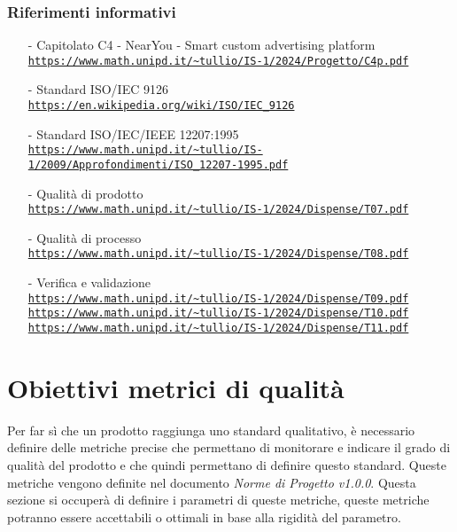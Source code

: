 \documentclass[11pt]{article}
\begin{document}
\begin{justify}
\subsubsection{Riferimenti informativi}
\begin{itemize}
    \item[-] Capitolato C4 - NearYou -
Smart custom advertising platform\\
    \textcolor{blue}{\texttt{\url{https://www.math.unipd.it/~tullio/IS-1/2024/Progetto/C4p.pdf}}}
    \item[-] Standard ISO/IEC 9126 \label{ISO 9126} \\
    \textcolor{blue}{\texttt{\url{https://en.wikipedia.org/wiki/ISO/IEC_9126}}}
    \item[-] Standard ISO/IEC/IEEE 12207:1995 \label{ISO 12207:1995}\\
    \textcolor{blue}{\texttt{\url{https://www.math.unipd.it/~tullio/IS-1/2009/Approfondimenti/ISO_12207-1995.pdf}}}
    \item[-] Qualità di prodotto\\
    \textcolor{blue}{\texttt{\url{https://www.math.unipd.it/~tullio/IS-1/2024/Dispense/T07.pdf}}}
    \item[-] Qualità di processo\\
    \textcolor{blue}{\texttt{\url{https://www.math.unipd.it/~tullio/IS-1/2024/Dispense/T08.pdf}}}
    \item[-] Verifica e validazione\\
    \textcolor{blue}{\texttt{\url{https://www.math.unipd.it/~tullio/IS-1/2024/Dispense/T09.pdf}}}\\
    \textcolor{blue}{\texttt{\url{https://www.math.unipd.it/~tullio/IS-1/2024/Dispense/T10.pdf}}}\\
    \textcolor{blue}{\texttt{\url{https://www.math.unipd.it/~tullio/IS-1/2024/Dispense/T11.pdf}}}



\end{itemize}
\newpage

\section{Obiettivi metrici di qualità}
Per far sì che un prodotto raggiunga uno standard qualitativo, è necessario definire delle metriche precise che permettano di monitorare e indicare il grado di qualità del prodotto e che quindi permettano di definire questo standard.
Queste metriche vengono definite nel documento \textit{Norme di Progetto v1.0.0}.
Questa sezione si occuperà di definire i parametri di queste metriche, queste metriche potranno essere accettabili o ottimali in base alla rigidità del parametro.\\


\end{justify}
\end{document}
